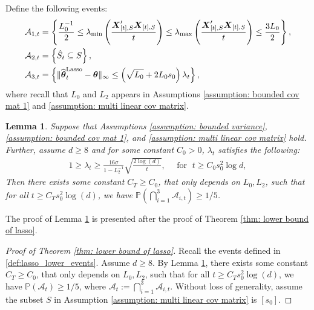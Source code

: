\documentclass[aos,preprint]{imsart}
\theoremstyle{plain}
\newtheorem{lemma}[theorem]{Lemma}
\theoremstyle{definition}
\newcommand{\btheta}{\boldsymbol{\theta}}
\newcommand{\hbtheta}{\widehat{\boldsymbol{\theta}}}
\newcommand{\bX}{\boldsymbol{X}}
\newcommand{\lmin}[1]{\lambda_{\min}\left(#1\right)}
\newcommand{\lmax}[1]{\lambda_{\max}\left(#1\right)}
\newcommand{\ltheta}{\hbtheta^{\textup{Lasso}}}
\newcommand{\cA}{\mathcal{A}}
\newcommand{\Pro}{\mathbb{P}}
\begin{document}
\begin{appendix}
Define the following events:
\begin{equation}\label{def:lasso_lower_events}
\begin{aligned}
    &\mathcal{A}_{1,t}=\left\{\frac{L_0^{-1}}{2}\le \lmin{\frac{\bX_{[t],S}'\bX_{[t],S}}{t}} \le \lmax{\frac{\bX_{[t],S}'\bX_{[t],S}}{t}} \le \frac{3L_0}{2}  \right\},
    \\&
    \mathcal{A}_{2,t}=\left\{\hat{S}_{t} \subseteq S \right\},
    \\&
    \mathcal{A}_{3,t}=\left\{\|\ltheta_t - \btheta\|_{\infty} \leq \left( 
    \sqrt{L_0} + 2 L_0 s_0
    \right) \lambda_t\right\},
\end{aligned}
\end{equation}
where recall that $L_0$ and $L_2$ appears in Assumptions \ref{assumption: bounded cov mat 1} and \ref{assumption: multi linear cov matrix}.

\begin{lemma}\label{lemma:lasso_lower_events}
Suppose that Assumptions \ref{assumption: bounded variance},  \ref{assumption: bounded cov mat 1}, and  \ref{assumption: multi linear cov matrix} hold. Further, assume $d \geq 8$ and for some constant $C_0 > 0$, $\lambda_t$ satisfies the following:
\begin{align}
    \label{lasso:lower_lambda}
   1 \geq  \lambda_t \geq \frac{16\sigma}{1 - L_2^{-1}} \sqrt{\frac{2\log(d)}{t}}, \quad \text{ for } \; t \geq C_0 s_0^2 \log d,
\end{align}
Then there exists some constant $C_T \geq C_0$, that only depends on $L_0,L_2$, such that for all $t \geq C_T s_0^2 \log(d)$, we have $\Pro\left(\bigcap_{i=1}^{3} \cA_{i,t} \right) \geq 1/5$.
\end{lemma}

The proof of Lemma \ref{lemma:lasso_lower_events} is presented after the proof of Theorem  \ref{thm: lower bound of lasso}.

\begin{proof}[Proof of Theorem \ref{thm: lower bound of lasso}]
Recall the events defined in \eqref{def:lasso_lower_events}. Assume $d \geq 8$.  By Lemma \ref{lemma:lasso_lower_events}, there exists some constant $C_T \geq C_0$, that only depends on $L_0,L_2$, such that for all $t \geq C_T s_0^2 \log(d)$, we have $\Pro\left(\cA_t\right) \geq 1/5$, where $\cA_t := \bigcap_{i=1}^{3} \cA_{i,t}$. Without loss of generality, assume the subset $S$ in Assumption \ref{assumption: multi linear cov matrix} is $[s_0]$.



\end{proof}
\end{appendix}
\end{document}
